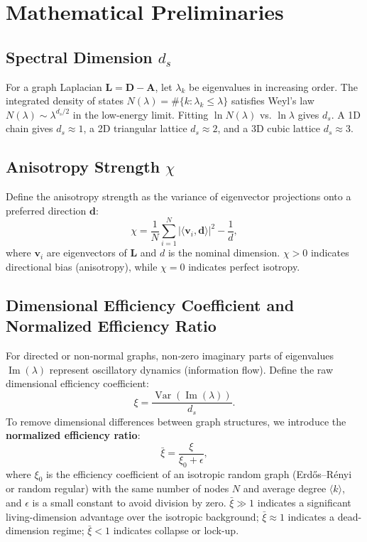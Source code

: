 \documentclass[12pt,a4paper]{article}
\begin{document}
\section{Mathematical Preliminaries}

\subsection{Spectral Dimension $d_s$}

For a graph Laplacian $\mathbf{L}=\mathbf{D}-\mathbf{A}$, let $\lambda_k$ be eigenvalues in increasing order. The integrated density of states $N(\lambda)=\#\{k:\lambda_k\le\lambda\}$ satisfies Weyl's law $N(\lambda)\sim\lambda^{d_s/2}$ in the low-energy limit. Fitting $\ln N(\lambda)$ vs. $\ln\lambda$ gives $d_s$. A 1D chain gives $d_s\approx1$, a 2D triangular lattice $d_s\approx2$, and a 3D cubic lattice $d_s\approx3$.

\subsection{Anisotropy Strength $\chi$}

Define the anisotropy strength as the variance of eigenvector projections onto a preferred direction $\mathbf{d}$:
\[
\chi = \frac{1}{N}\sum_{i=1}^N |\langle \mathbf{v}_i,\mathbf{d}\rangle|^2 - \frac{1}{d},
\]
where $\mathbf{v}_i$ are eigenvectors of $\mathbf{L}$ and $d$ is the nominal dimension. $\chi>0$ indicates directional bias (anisotropy), while $\chi=0$ indicates perfect isotropy.

\subsection{Dimensional Efficiency Coefficient and Normalized Efficiency Ratio}

For directed or non‑normal graphs, non‑zero imaginary parts of eigenvalues $\operatorname{Im}(\lambda)$ represent oscillatory dynamics (information flow). Define the raw dimensional efficiency coefficient:
\[
\xi = \frac{\operatorname{Var}(\operatorname{Im}(\lambda))}{d_s}.
\]
To remove dimensional differences between graph structures, we introduce the \textbf{normalized efficiency ratio}:
\[
\bar{\xi} = \frac{\xi}{\xi_0 + \epsilon},
\]
where $\xi_0$ is the efficiency coefficient of an isotropic random graph (Erdős–Rényi or random regular) with the same number of nodes $N$ and average degree $\langle k \rangle$, and $\epsilon$ is a small constant to avoid division by zero. $\bar{\xi}\gg1$ indicates a significant living-dimension advantage over the isotropic background; $\bar{\xi}\approx1$ indicates a dead-dimension regime; $\bar{\xi}<1$ indicates collapse or lock-up.
\end{document}
